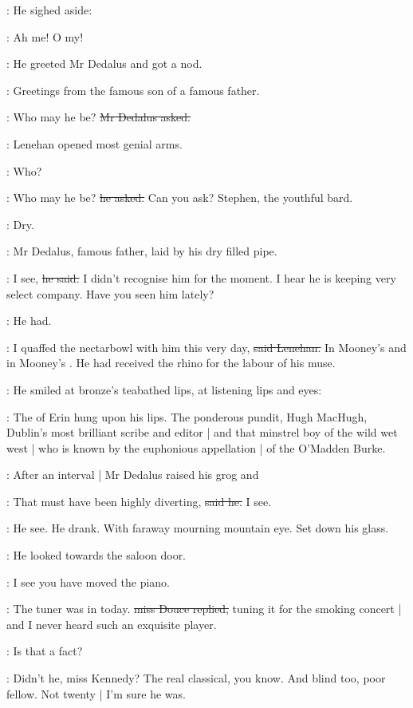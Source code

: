 :
He sighed aside:

\lenehan:
Ah me!
O my!

:
He greeted Mr Dedalus and got a nod.

\lenehan:
Greetings from the famous son of a famous father.

\simon:
Who may he be?
\sout{Mr Dedalus asked.}

:
Lenehan opened most genial arms.

\lenehan:
Who?

\lenehan:
Who may he be?
\sout{he asked.}
Can you ask?
Stephen,
the youthful bard.

:
Dry.

:
Mr Dedalus,
famous father,
laid by his dry filled pipe.

\simon:
I see,
\sout{he said.}
I didn't recognise him for the moment.
I hear he is keeping very select company.
Have you seen him lately?

:
He had.

\lenehan:
I quaffed the nectarbowl with him this very day,
\sout{said Lenehan.}
In Mooney's 
and in Mooney's .
He had received the rhino for the labour of his muse.

:
He smiled at bronze's teabathed lips,
at listening lips and eyes:

\lenehan:
The  of Erin hung upon his lips.
The ponderous pundit,
Hugh MacHugh,
Dublin's most brilliant scribe and editor |
and that minstrel boy of the wild wet west |
who is known by
the euphonious appellation |
of the O'Madden
Burke.

:
After an interval |
Mr Dedalus raised his grog and

\simon:
That must have been highly diverting,
\sout{said he.}
I see.

:
He see.
He drank.
With faraway mourning mountain eye.
Set down his glass.

:
He looked towards the saloon door.

\simon:
I see you have moved the piano.

\MissD:
The tuner was in today.
\sout{miss Douce replied,}
tuning it for the smoking concert |
and I never heard such an exquisite player.

\simon:
Is that a fact?

\MissD:
Didn't he,
miss Kennedy?
The real classical,
you know.
And blind too,
poor fellow.
Not twenty |
I'm sure he was.

